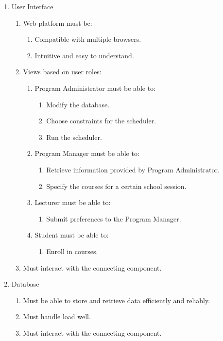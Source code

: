 \documentclass[12pt]{article}
\begin{document}
\begin{enumerate}
\item User Interface
	\begin{enumerate}
	\item Web platform must be:
		\begin{enumerate}
		\item Compatible with multiple browsers.
		\item	Intuitive and easy to understand.
		\end{enumerate}
	\item Views based on user roles:
		\begin{enumerate}
		\item Program Administrator must be able to:
			\begin{enumerate}
		    \item Modify the database.
		    \item Choose constraints for the scheduler.
		    \item Run the scheduler.
		    \end{enumerate}
		\item Program Manager must be able to:
			\begin{enumerate}
		   \item Retrieve information provided by Program Administrator.
		   \item Specify the courses for a certain school session.
		   \end{enumerate}
		\item Lecturer must be able to:
			\begin{enumerate}
			\item Submit preferences to the Program Manager.
			\end{enumerate}
		\item Student must be able to:
			\begin{enumerate}
		   \item Enroll in courses.
		   \end{enumerate}
		\end{enumerate}
	\item Must interact with the connecting component.
	\end{enumerate}
\item Database
	\begin{enumerate}
	\item Must be able to store and retrieve data efficiently and reliably.
	\item Must handle load well.
	\item Must interact with the connecting component.

\end{enumerate}
\end{enumerate}
\end{document}
